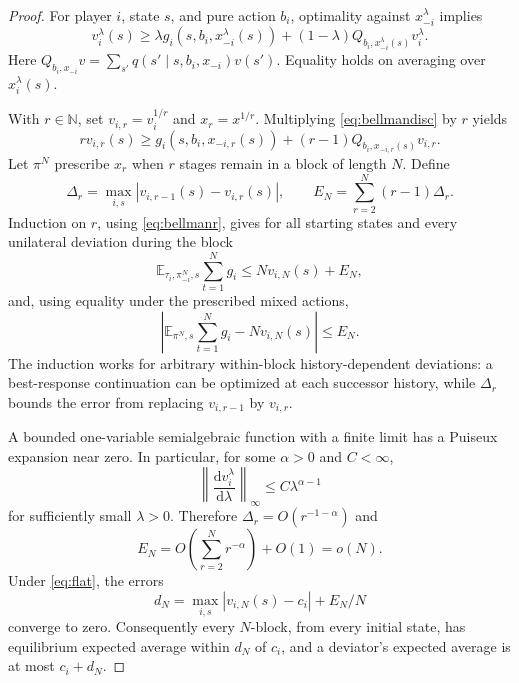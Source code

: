 \documentclass[11pt,a4paper]{article}
\numberwithin{equation}{section}
\theoremstyle{definition}
\theoremstyle{remark}
\newcommand{\E}{\mathbb E}
\newcommand{\dd}{\mathrm d}
\begin{document}
\begin{proof}
For player $i$, state $s$, and pure action $b_i$, optimality against
$x_{-i}^\lambda$ implies
\begin{equation}\label{eq:bellmandisc}
 v_i^\lambda(s)\ge\lambda
 g_i(s,b_i,x_{-i}^\lambda(s))
 +(1-\lambda)Q_{b_i,x_{-i}^\lambda(s)}v_i^\lambda.
\end{equation}
Here $Q_{b_i,x_{-i}}v=\sum_{s'}q(s'\mid s,b_i,x_{-i})v(s')$.
Equality holds on averaging over $x_i^\lambda(s)$.

With $r\in\mathbb N$, set $v_{i,r}=v_i^{1/r}$ and $x_r=x^{1/r}$.
Multiplying \eqref{eq:bellmandisc} by $r$ yields
\begin{equation}\label{eq:bellmanr}
 r v_{i,r}(s)\ge g_i(s,b_i,x_{-i,r}(s))
 +(r-1)Q_{b_i,x_{-i,r}(s)}v_{i,r}.
\end{equation}
Let $\pi^N$ prescribe $x_r$ when $r$ stages remain in a block of
length $N$. Define
\[
 \Delta_r=\max_{i,s}|v_{i,r-1}(s)-v_{i,r}(s)|,\qquad
 E_N=\sum_{r=2}^N(r-1)\Delta_r.
\]
Induction on $r$, using \eqref{eq:bellmanr}, gives for all starting states
and every unilateral deviation during the block
\begin{equation}\label{eq:blocks}
 \E_{\tau_i,\pi^N_{-i},s}\sum_{t=1}^N g_i
 \le N v_{i,N}(s)+E_N,
\end{equation}
and, using equality under the prescribed mixed actions,
\begin{equation}\label{eq:blockbaseline}
 \left|\E_{\pi^N,s}\sum_{t=1}^N g_i-Nv_{i,N}(s)\right|
 \le E_N.
\end{equation}
The induction works for arbitrary within-block history-dependent deviations:
a best-response continuation can be optimized at each successor history,
while $\Delta_r$ bounds the error from replacing $v_{i,r-1}$ by $v_{i,r}$.

A bounded one-variable semialgebraic function with a finite limit has a
Puiseux expansion near zero. In particular, for some $\alpha>0$ and $C<\infty$,
\[
 \left\|\frac{\dd v_i^\lambda}{\dd\lambda}\right\|_\infty
 \le C\lambda^{\alpha-1}
\]
for sufficiently small $\lambda>0$. Therefore
$\Delta_r=O(r^{-1-\alpha})$ and
\begin{equation}\label{eq:error}
 E_N=O\left(\sum_{r=2}^Nr^{-\alpha}\right)+O(1)=o(N).
\end{equation}
Under \eqref{eq:flat}, the errors
\[
 d_N=\max_{i,s}|v_{i,N}(s)-c_i|+E_N/N
\]
converge to zero. Consequently every $N$-block, from every initial state,
has equilibrium expected average within $d_N$ of $c_i$, and a deviator's
expected average is at most $c_i+d_N$.


\end{proof}
\end{document}
